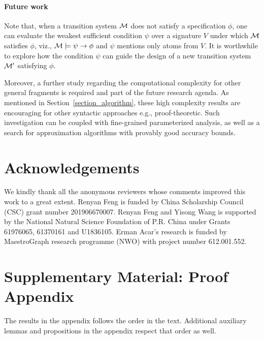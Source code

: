 \documentclass{article}
\begin{document}
\paragraph{Future work}
Note that, when a transition system $\cal M$ does not satisfy a specification $\phi$, one can evaluate the weakest sufficient condition  $\psi$ over a signature $V$ under which ${\cal M}$ satisfies $\phi$, viz., ${\cal M}\models\psi\rightarrow \phi$ and $\psi$ mentions only atoms from $V$. It is worthwhile to explore how the condition $\psi$ can guide the design of a new transition system ${\cal M}'$ satisfying $\phi$.



Moreover, a further study regarding the computational complexity for other general fragments is required and part of the future research agenda. As mentioned in Section~\ref{section_algorithm}, these high complexity results are encouraging for other syntactic approaches e.g., proof-theoretic. Such investigation can be coupled with fine-grained parameterized analysis, as well as a search for approximation algorithms with provably good accuracy bounds.

\section*{Acknowledgements}
We kindly thank all the anonymous reviewers whose comments improved this work to a great extent.
Renyan Feng is funded by China Scholarship Council (CSC) grant number 201906670007.
Renyan Feng and Yisong Wang is supported by the National Natural Science Foundation of P.R. China under Grants 61976065, 61370161 and U1836105.
Erman Acar's research is funded by MaestroGraph research programme (NWO) with project number 612.001.552.


%
%
%

 \clearpage
 \appendix
 \section{Supplementary Material: Proof Appendix}
The results in the appendix follows the order in the text. Additional auxiliary lemmas and propositions in the appendix respect that order as well.\\
\end{document}
